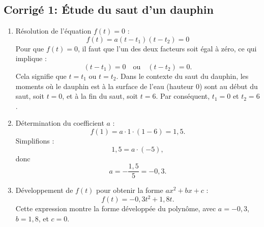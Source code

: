 \documentclass{article}
\date{}
\begin{document}
\begin{center}
\section*{Corrigé 1: Étude du saut d'un dauphin}
\end{center}
\bigskip
\bigskip

\begin{enumerate}
    \item Résolution de l'équation $f(t) = 0$ :
       $$
       f(t) = a (t - t_1)(t - t_2) = 0
       $$
       Pour que $f(t) = 0$, il faut que l'un des deux facteurs soit égal à zéro, ce qui implique :
       $$
       (t - t_1) = 0 \quad \text{ou} \quad (t - t_2) = 0.
       $$
       Cela signifie que $t = t_1$ ou $t = t_2$. Dans le contexte du saut du dauphin, les moments où le dauphin est à la surface de l’eau (hauteur 0) sont au début du saut, soit $t = 0$, et à la fin du saut, soit $t = 6$. Par conséquent, $t_1 = 0$ et $t_2 = 6$.

    \item Détermination du coefficient $a$ :
       $$
       f(1) = a \cdot 1 \cdot (1 - 6) = 1,5.
       $$
       Simplifions :
       $$
       1,5 = a \cdot (-5),
       $$
       donc
       $$
       a = -\frac{1,5}{5} = -0,3.
       $$

    \item Développement de $f(t)$ pour obtenir la forme $ax^2 + bx + c$ :
       $$
       f(t) = -0,3 t^2 + 1,8 t.
       $$
       Cette expression montre la forme développée du polynôme, avec $a = -0,3$, $b = 1,8$, et $c = 0$.
\end{enumerate}
\end{document}
